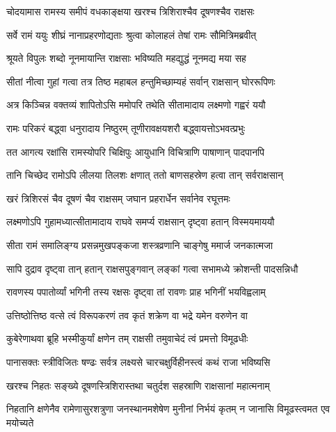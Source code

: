 \twolineshloka
{चोदयामास रामस्य समीपं वधकाङ्क्षया}
{खरश्च त्रिशिराश्चैव दूषणश्चैव राक्षसः} %

\twolineshloka
{सर्वे रामं ययुः शीघ्रं नानाप्रहरणोद्यताः}
{श्रुत्वा कोलाहलं तेषां रामः सौमित्रिमब्रवीत्} %

\twolineshloka
{श्रूयते विपुलः शब्दो नूनमायान्ति राक्षसाः}
{भविष्यति महद्युद्धं नूनमद्य मया सह} %

\twolineshloka
{सीतां नीत्वा गुहां गत्वा तत्र तिष्ठ महाबल}
{हन्तुमिच्छाम्यहं सर्वान् राक्षसान् घोररूपिणः} %

\twolineshloka
{अत्र किञ्चिन्न वक्तव्यं शापितोऽसि ममोपरि}
{तथेति सीतामादाय लक्ष्मणो गह्वरं ययौ} %

\twolineshloka
{रामः परिकरं बद्ध्वा धनुरादाय निष्ठुरम्}
{तूणीरावक्षयशरौ बद्ध्वायत्तोऽभवत्प्रभुः} %

\twolineshloka
{तत आगत्य रक्षांसि रामस्योपरि चिक्षिपुः}
{आयुधानि विचित्राणि पाषाणान् पादपानपि} %

\twolineshloka
{तानि चिच्छेद रामोऽपि लीलया तिलशः क्षणात्}
{ततो बाणसहस्रेण हत्वा तान् सर्वराक्षसान्} %

\twolineshloka
{खरं त्रिशिरसं चैव दूषणं चैव राक्षसम्}
{जघान प्रहरार्धेन सर्वानेव रघूत्तमः} %

\twolineshloka
{लक्ष्मणोऽपि गुहामध्यात्सीतामादाय राघवे}
{समर्प्य राक्षसान् दृष्ट्वा हतान् विस्मयमाययौ} %

\twolineshloka
{सीता रामं समालिङ्ग्य प्रसन्नमुखपङ्कजा}
{शस्त्रव्रणानि चाङ्गेषु ममार्ज जनकात्मजा} %

\twolineshloka
{सापि दुद्राव दृष्ट्वा तान् हतान् राक्षसपुङ्गवान्}
{लङ्कां गत्वा सभामध्ये क्रोशन्ती पादसन्निधौ} %

\twolineshloka
{रावणस्य पपातोर्व्यां भगिनी तस्य रक्षसः}
{दृष्ट्वा तां रावणः प्राह भगिनीं भयविह्वलाम्} %

\twolineshloka
{उत्तिष्ठोत्तिष्ठ वत्से त्वं विरूपकरणं तव}
{कृतं शक्रेण वा भद्रे यमेन वरुणेन वा} %

\twolineshloka
{कुबेरेणाथवा ब्रूहि भस्मीकुर्यां क्षणेन तम्}
{राक्षसी तमुवाचेदं त्वं प्रमत्तो विमूढधीः} %

\twolineshloka
{पानासक्तः स्त्रीविजितः षण्ढः सर्वत्र लक्ष्यसे}
{चारचक्षुर्विहीनस्त्वं कथं राजा भविष्यसि} %

\twolineshloka
{खरश्च निहतः सङ्ख्ये दूषणस्त्रिशिरास्तथा}
{चतुर्दश सहस्राणि राक्षसानां महात्मनाम्} %

\threelineshloka
{निहतानि क्षणेनैव रामेणासुरशत्रुणा}
{जनस्थानमशेषेण मुनीनां निर्भयं कृतम्}
{न जानासि विमूढस्त्वमत एव मयोच्यते} %

